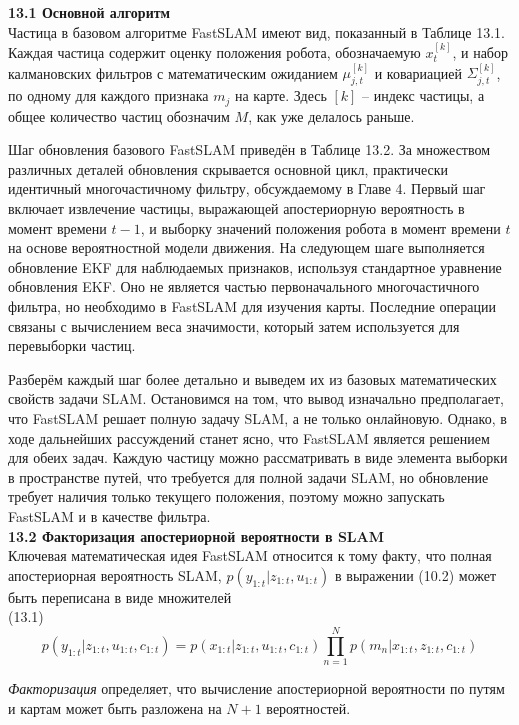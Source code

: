 \documentclass[10pt,a4paper]{article}
\begin{document}
\textbf{13.1	Основной алгоритм}\\

Частица в базовом алгоритме FastSLAM имеют вид, показанный в Таблице 13.1.  Каждая частица содержит оценку положения робота, обозначаемую $x_t^[k]$, и набор калмановских фильтров с математическим ожиданием $\mu_{j,t}^[k]$ и ковариацией $\varSigma_{j,t}^[k]$, по одному для каждого признака
$m_j$ на карте.  Здесь $[k]$ – индекс частицы, а общее количество частиц обозначим $M$, как уже делалось раньше.

Шаг обновления базового FastSLAM приведён в Таблице 13.2. За множеством различных деталей обновления скрывается основной цикл, практически идентичный многочастичному фильтру, обсуждаемому в Главе 4. Первый шаг включает извлечение частицы, выражающей апостериорную вероятность в момент времени $t-1$, и выборку значений положения робота в момент времени $t$ на основе вероятностной модели движения. На следующем шаге выполняется обновление EKF для наблюдаемых признаков, используя стандартное уравнение обновления EKF. Оно не является частью  первоначального многочастичного фильтра, но необходимо в FastSLAM для изучения карты. Последние операции связаны с вычислением веса значимости, который затем используется для перевыборки частиц.

Разберём каждый шаг более детально и выведем их из базовых математических свойств задачи SLAM. Остановимся на том, что вывод изначально предполагает, что FastSLAM решает полную задачу SLAM, а не только онлайновую. Однако, в ходе дальнейших рассуждений станет ясно, что FastSLAM является решением для обеих задач. Каждую частицу можно рассматривать в виде элемента выборки в пространстве путей, что требуется для полной задачи SLAM, но обновление требует наличия только текущего положения, поэтому можно запускать FastSLAM и в качестве фильтра.\\

\textbf{13.2	Факторизация апостериорной вероятности в SLAM }\\

Ключевая математическая идея FastSLAM относится к тому факту, что полная апостериорная вероятность SLAM, $p(y_{1:t}|z_{1:t},u_{1:t})$ в выражении (10.2) может быть переписана в виде множителей\\

(13.1)
$$p(y_{1:t}|z_{1:t},u_{1:t},c_{1:t})=p(x_{1:t}|z_{1:t},u_{1:t},c_{1:t})\prod_{n=1}^Np(m_n|x_{1:t},z_{1:t},c_{1:t})$$

\textit{Факторизация} определяет, что вычисление апостериорной вероятности по путям и картам может быть разложена на $N +1$ вероятностей.
\end{document}
